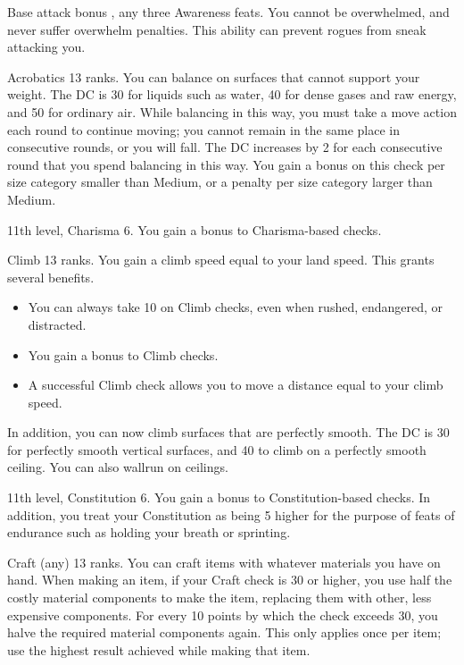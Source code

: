 \featpre Base attack bonus , any three Awareness feats.
\featben You cannot be overwhelmed, and never suffer overwhelm penalties. This ability can prevent rogues from sneak attacking you.

\featpre Acrobatics 13 ranks.
\featben You can balance on surfaces that cannot support your weight. The DC is 30 for liquids such as water, 40 for dense gases and raw energy, and 50 for ordinary air. While balancing in this way, you must take a move action each round to continue moving; you cannot remain in the same place in consecutive rounds, or you will fall. The DC increases by 2 for each consecutive round that you spend balancing in this way. You gain a  bonus on this check per size category smaller than Medium, or a  penalty per size category larger than Medium.

\featpre 11th level, Charisma 6.
\featben You gain a  bonus to Charisma-based checks.

\featpre Climb 13 ranks.
\featben You gain a climb speed equal to your land speed. This grants several benefits.
\begin{itemize}
    \item You can always take 10 on Climb checks, even when rushed, endangered, or distracted.
    \item You gain a  bonus to Climb checks.
    \item A successful Climb check allows you to move a distance equal to your climb speed.
\end{itemize}

In addition, you can now climb surfaces that are perfectly smooth. The DC is 30 for perfectly smooth vertical surfaces, and 40 to climb on a perfectly smooth ceiling. You can also wallrun on ceilings.

\featpre 11th level, Constitution 6.
\featben You gain a  bonus to Constitution-based checks. In addition, you treat your Constitution as being 5 higher for the purpose of feats of endurance such as holding your breath or sprinting.

\featpre Craft (any) 13 ranks.
\featben You can craft items with whatever materials you have on hand. When making an item, if your Craft check is 30 or higher, you use half the costly material components to make the item, replacing them with other, less expensive components. For every 10 points by which the check exceeds 30, you halve the required material components again. This only applies once per item; use the highest result achieved while making that item.

